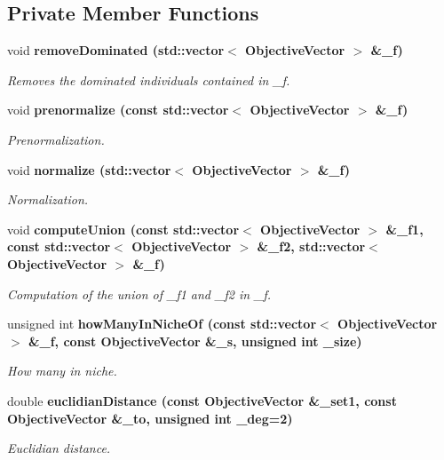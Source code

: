 \subsection*{Private Member Functions}
\begin{CompactItemize}
\item 
void \bf{remove\-Dominated} (std::vector$<$ Objective\-Vector $>$ \&\_\-f)
\begin{CompactList}\small\item\em Removes the dominated individuals contained in \_\-f. \item\end{CompactList}\item 
void \bf{prenormalize} (const std::vector$<$ Objective\-Vector $>$ \&\_\-f)
\begin{CompactList}\small\item\em Prenormalization. \item\end{CompactList}\item 
void \bf{normalize} (std::vector$<$ Objective\-Vector $>$ \&\_\-f)
\begin{CompactList}\small\item\em Normalization. \item\end{CompactList}\item 
void \bf{compute\-Union} (const std::vector$<$ Objective\-Vector $>$ \&\_\-f1, const std::vector$<$ Objective\-Vector $>$ \&\_\-f2, std::vector$<$ Objective\-Vector $>$ \&\_\-f)
\begin{CompactList}\small\item\em Computation of the union of \_\-f1 and \_\-f2 in \_\-f. \item\end{CompactList}\item 
unsigned int \bf{how\-Many\-In\-Niche\-Of} (const std::vector$<$ Objective\-Vector $>$ \&\_\-f, const Objective\-Vector \&\_\-s, unsigned int \_\-size)\label{classmoeoEntropyMetric_7977dac672bd6e2e1dfff8cf7954c180}

\begin{CompactList}\small\item\em How many in niche. \item\end{CompactList}\item 
double \bf{euclidian\-Distance} (const Objective\-Vector \&\_\-set1, const Objective\-Vector \&\_\-to, unsigned int \_\-deg=2)\label{classmoeoEntropyMetric_4716a673498a0681fb78414e390824a3}

\begin{CompactList}\small\item\em Euclidian distance. \item\end{CompactList}\end{CompactItemize}
